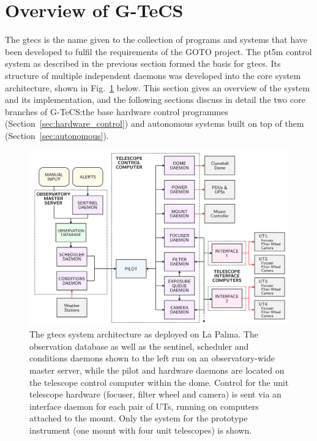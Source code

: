 \section{Overview of G-TeCS}
\label{sec:gtecs}
\begin{colsection}


\begin{colsection}

The \gls{gtecs} is the name given to the collection of programs and systems that have been developed to fulfil the requirements of the GOTO project. The \gls{pt5m} control system as described in the previous section formed the basis for \gls{gtecs}. Its structure of multiple independent daemons was developed into the core system architecture, shown in Fig.~\ref{fig:flow} below. This section gives an overview of the system and its implementation, and the following sections discuss in detail the two core branches of G-TeCS:\@ the base hardware control programmes (Section~\ref{sec:hardware_control}) and autonomous systems built on top of them (Section~\ref{sec:autonomous}).

\begin{figure}[h]
\begin{center}
\includegraphics[width=\linewidth]{images/flow.pdf}
\end{center}
\caption[The G-TeCS system architecture]{The \gls{gtecs} system architecture as deployed on La Palma. The observation database as well as the sentinel, scheduler and conditions daemons shown to the left run on an observatory-wide master server, while the pilot and hardware daemons are located on the telescope control computer within the dome. Control for the unit telescope hardware (focuser, filter wheel and camera) is sent via an interface daemon for each pair of UTs, running on computers attached to the mount. Only the system for the prototype instrument (one mount with four unit telescopes) is shown.}
\label{fig:flow}
\end{figure}


\end{colsection}
\end{colsection}

